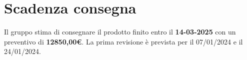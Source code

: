 \section{Scadenza consegna}

Il gruppo stima di consegnare il prodotto finito entro il \textbf{14-03-2025} con un preventivo di \textbf{12850,00\euro}. La prima revisione è prevista per il 07/01/2024 e il 24/01/2024.